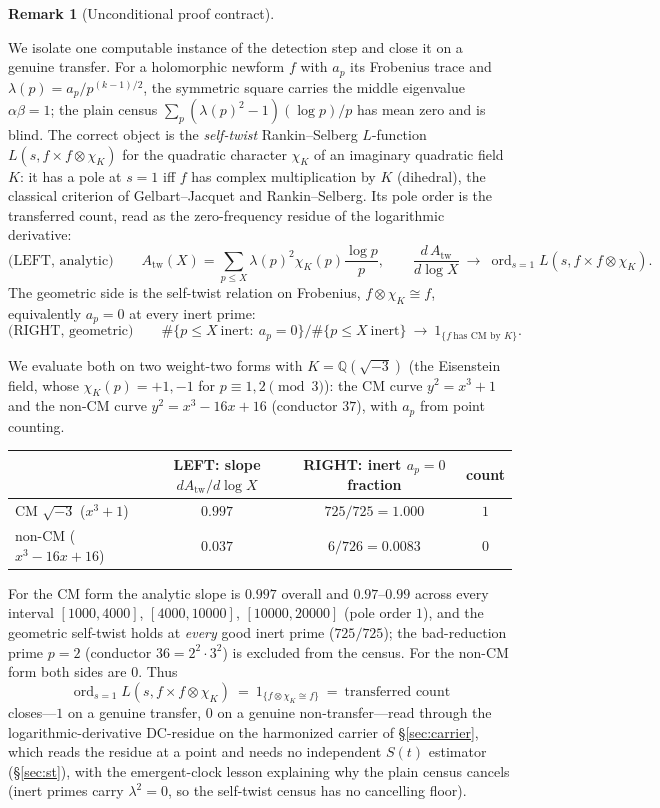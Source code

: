\documentclass[11pt]{article}
\theoremstyle{definition}
\newtheorem{remark}[theorem]{Remark}
\newcommand{\ord}{\operatorname{ord}}
\begin{document}
\begin{remark}[Unconditional proof contract]
\begin{enumerate}
We isolate one computable instance of the detection step and close it on a genuine transfer. For a
holomorphic newform $f$ with $a_p$ its Frobenius trace and $\lambda(p)=a_p/p^{(k-1)/2}$, the
symmetric square carries the middle eigenvalue $\alpha\beta=1$; the plain census
$\sum_p(\lambda(p)^2-1)(\log p)/p$ has mean zero and is blind. The correct object is the
\emph{self-twist} Rankin--Selberg $L$-function $L(s,f\times f\otimes\chi_K)$ for the quadratic
character $\chi_K$ of an imaginary quadratic field $K$: it has a pole at $s=1$ iff $f$ has complex
multiplication by $K$ (dihedral), the classical criterion of Gelbart--Jacquet \cite{GJ} and
Rankin--Selberg.
Its pole order is the transferred count, read as the zero-frequency residue of the logarithmic
derivative:
\[
  \text{(LEFT, analytic)}\qquad
  A_{\mathrm{tw}}(X)=\sum_{p\le X}\lambda(p)^2\chi_K(p)\frac{\log p}{p},\qquad
  \frac{d\,A_{\mathrm{tw}}}{d\log X}\ \longrightarrow\ \ord_{s=1}L(s,f\times f\otimes\chi_K).
\]
The geometric side is the self-twist relation on Frobenius, $f\otimes\chi_K\cong f$, equivalently
$a_p=0$ at every inert prime:
\[
  \text{(RIGHT, geometric)}\qquad
  \#\{p\le X\ \text{inert}:\ a_p=0\}\big/\#\{p\le X\ \text{inert}\}\ \longrightarrow\ 1_{\{f\ \text{has CM by }K\}}.
\]

We evaluate both on two weight-two forms with $K=\mathbb Q(\sqrt{-3})$ (the Eisenstein field, whose
$\chi_K(p)=+1,-1$ for $p\equiv1,2\pmod3$): the CM curve $y^2=x^3+1$ and the non-CM curve
$y^2=x^3-16x+16$ (conductor $37$), with $a_p$ from point counting.

\begin{center}
\begin{tabular}{lccc}
\toprule
 & LEFT: slope $dA_{\mathrm{tw}}/d\log X$ & RIGHT: inert $a_p=0$ fraction & count \\
\midrule
CM $\sqrt{-3}$ ($x^3+1$) & $0.997$ & $725/725=1.000$ & $1$ \\
non-CM ($x^3-16x+16$) & $0.037$ & $6/726=0.0083$ & $0$ \\
\bottomrule
\end{tabular}
\end{center}

For the CM form the analytic slope is $0.997$ overall and $0.97$--$0.99$ across every interval $[1000,4000]$,
$[4000,10000]$, $[10000,20000]$ (pole order $1$), and the geometric self-twist holds at \emph{every} good
inert prime ($725/725$); the bad-reduction prime $p=2$ (conductor $36=2^2\cdot3^2$) is excluded from the
census. For the non-CM form both sides are $0$. Thus
\[
  \boxed{\ \ord_{s=1}L(s,f\times f\otimes\chi_K)\ =\ 1_{\{f\otimes\chi_K\cong f\}}\ =\ \text{transferred count}\ }
\]
closes---$1$ on a genuine transfer, $0$ on a genuine non-transfer---read through the logarithmic-derivative DC-residue on the harmonized carrier of \S\ref{sec:carrier}, which reads the residue at a point and
needs no independent $S(t)$ estimator (\S\ref{sec:st}), with the emergent-clock
lesson explaining why the plain census cancels (inert primes carry $\lambda^2=0$, so the self-twist
census has no cancelling floor).


\end{enumerate}
\end{remark}
\end{document}
